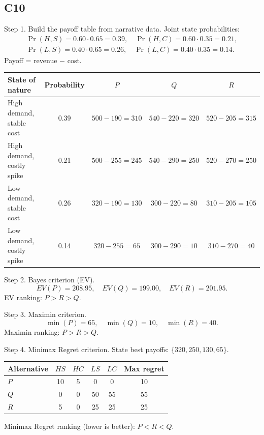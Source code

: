 \begin{ExamProblems}
		\subsection*{C10}
		Step 1. Build the payoff table from narrative data.
		Joint state probabilities:
		\[
		\begin{gathered}\Pr(H,S)=0.60\cdot 0.65=0.39,\quad \Pr(H,C)=0.60\cdot 0.35=0.21,\\ \Pr(L,S)=0.40\cdot 0.65=0.26,\quad \Pr(L,C)=0.40\cdot 0.35=0.14.\end{gathered}
		\]
		Payoff = revenue $-$ cost.
		\begin{center}
			\begin{tabular}{l c c c c}
				\toprule
				State of nature & Probability & $P$ & $Q$ & $R$ \\
				\midrule
				High demand, stable cost & 0.39 & $500-190=310$ & $540-220=320$ & $520-205=315$ \\
				High demand, costly spike & 0.21 & $500-255=245$ & $540-290=250$ & $520-270=250$ \\
				Low demand, stable cost & 0.26 & $320-190=130$ & $300-220=80$ & $310-205=105$ \\
				Low demand, costly spike & 0.14 & $320-255=65$ & $300-290=10$ & $310-270=40$ \\
				\bottomrule
			\end{tabular}
		\end{center}

		Step 2. Bayes criterion (EV).
		\[
		EV(P)=208.95,\quad EV(Q)=199.00,\quad EV(R)=201.95.
		\]
		EV ranking: $P>R>Q$.

		Step 3. Maximin criterion.
		\[
		\min(P)=65,\quad \min(Q)=10,\quad \min(R)=40.
		\]
		Maximin ranking: $P>R>Q$.

		Step 4. Minimax Regret criterion.
		State best payoffs: $\{320,250,130,65\}$.
		\begin{center}
			\begin{tabular}{l c c c c c}
				\toprule
				Alternative & $HS$ & $HC$ & $LS$ & $LC$ & Max regret \\
				\midrule
				$P$ & 10 & 5 & 0 & 0 & 10 \\
				$Q$ & 0 & 0 & 50 & 55 & 55 \\
				$R$ & 5 & 0 & 25 & 25 & 25 \\
				\bottomrule
			\end{tabular}
		\end{center}
		Minimax Regret ranking (lower is better): $P<R<Q$.


\end{ExamProblems}
